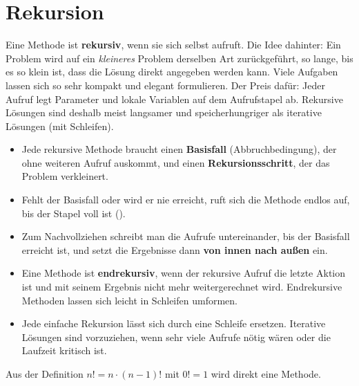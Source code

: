 \section{Rekursion}
\worum
Eine Methode ist \textbf{rekursiv}, wenn sie sich selbst aufruft. Die Idee dahinter: Ein Problem wird auf ein \emph{kleineres} Problem derselben Art zurückgeführt, so lange, bis es so klein ist, dass die Lösung direkt angegeben werden kann. Viele Aufgaben lassen sich so sehr kompakt und elegant formulieren. Der Preis dafür: Jeder Aufruf legt Parameter und lokale Variablen auf dem Aufrufstapel ab. Rekursive Lösungen sind deshalb meist langsamer und speicherhungriger als iterative Lösungen (mit Schleifen).

\begin{merke}
\begin{itemize}[itemsep=0.1em]
\item Jede rekursive Methode braucht einen \textbf{Basisfall} (Abbruchbedingung), der ohne weiteren Aufruf auskommt, und einen \textbf{Rekursionsschritt}, der das Problem verkleinert.
\item Fehlt der Basisfall oder wird er nie erreicht, ruft sich die Methode endlos auf, bis der Stapel voll ist ().
\item Zum Nachvollziehen schreibt man die Aufrufe untereinander, bis der Basisfall erreicht ist, und setzt die Ergebnisse dann \textbf{von innen nach außen} ein.
\item Eine Methode ist \textbf{endrekursiv}, wenn der rekursive Aufruf die letzte Aktion ist und mit seinem Ergebnis nicht mehr weitergerechnet wird. Endrekursive Methoden lassen sich leicht in Schleifen umformen.
\item Jede einfache Rekursion lässt sich durch eine Schleife ersetzen. Iterative Lösungen sind vorzuziehen, wenn sehr viele Aufrufe nötig wären oder die Laufzeit kritisch ist.
\end{itemize}
\end{merke}

\beispiele
{}
Aus der Definition $n! = n \cdot (n-1)!$ mit $0! = 1$ wird direkt eine Methode.

